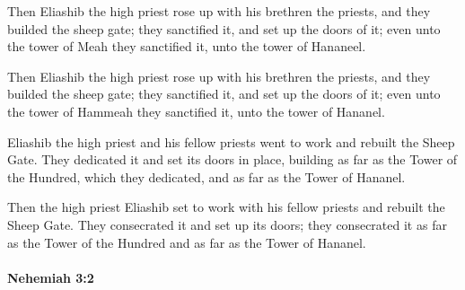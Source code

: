 			Then Eliashib the high priest rose up with his brethren the priests, and they builded the sheep gate; they sanctified it, and set up the doors of it; even unto the tower of Meah they sanctified it, unto the tower of Hananeel.

			\begin{versebox}
					\item[BHS] 
					\item[LXX] 
					\item[ASV] Then Eliashib the high priest rose up with his brethren the priests, and they builded the sheep gate; they sanctified it, and set up the doors of it; even unto the tower of Hammeah they sanctified it, unto the tower of Hananel.
					\item[NIV] Eliashib the high priest and his fellow priests went to work and rebuilt the Sheep Gate. They dedicated it and set its doors in place, building as far as the Tower of the Hundred, which they dedicated, and as far as the Tower of Hananel.
					\item[NRSV] Then the high priest Eliashib set to work with his fellow priests and rebuilt the Sheep Gate. They consecrated it and set up its doors; they consecrated it as far as the Tower of the Hundred and as far as the Tower of Hananel.
			\end{versebox}

		\paragraph{Nehemiah 3:2} %
			\label{NEHEMIAH-3-2}

